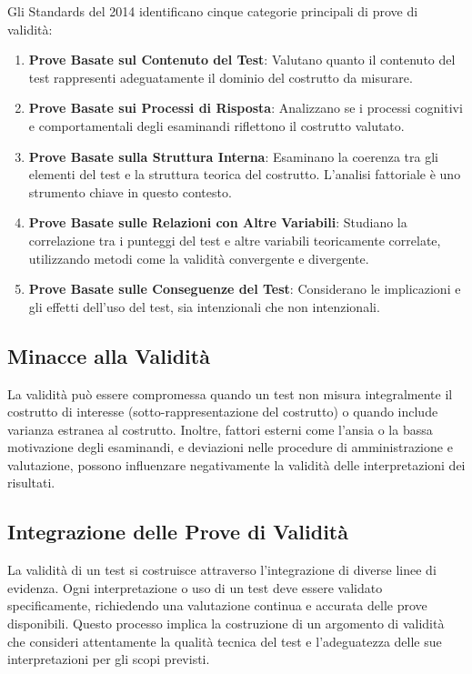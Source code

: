 \documentclass[
  letterpaper,
  krantz2]{{[}./krantz{]}}
\providecommand{\tightlist}{%
  \setlength{\itemsep}{0pt}\setlength{\parskip}{0pt}}\usepackage{longtable,booktabs,array}
\begin{document}
Gli Standards del 2014 identificano cinque categorie principali di prove
di validità:

\begin{enumerate}
\def\labelenumi{\arabic{enumi}.}
\tightlist
\item
  \textbf{Prove Basate sul Contenuto del Test}: Valutano quanto il
  contenuto del test rappresenti adeguatamente il dominio del costrutto
  da misurare.
\item
  \textbf{Prove Basate sui Processi di Risposta}: Analizzano se i
  processi cognitivi e comportamentali degli esaminandi riflettono il
  costrutto valutato.
\item
  \textbf{Prove Basate sulla Struttura Interna}: Esaminano la coerenza
  tra gli elementi del test e la struttura teorica del costrutto.
  L'analisi fattoriale è uno strumento chiave in questo contesto.
\item
  \textbf{Prove Basate sulle Relazioni con Altre Variabili}: Studiano la
  correlazione tra i punteggi del test e altre variabili teoricamente
  correlate, utilizzando metodi come la validità convergente e
  divergente.
\item
  \textbf{Prove Basate sulle Conseguenze del Test}: Considerano le
  implicazioni e gli effetti dell'uso del test, sia intenzionali che non
  intenzionali.
\end{enumerate}

\subsection{Minacce alla Validità}\label{minacce-alla-validituxe0}

La validità può essere compromessa quando un test non misura
integralmente il costrutto di interesse (sotto-rappresentazione del
costrutto) o quando include varianza estranea al costrutto. Inoltre,
fattori esterni come l'ansia o la bassa motivazione degli esaminandi, e
deviazioni nelle procedure di amministrazione e valutazione, possono
influenzare negativamente la validità delle interpretazioni dei
risultati.

\subsection{Integrazione delle Prove di
Validità}\label{integrazione-delle-prove-di-validituxe0}

La validità di un test si costruisce attraverso l'integrazione di
diverse linee di evidenza. Ogni interpretazione o uso di un test deve
essere validato specificamente, richiedendo una valutazione continua e
accurata delle prove disponibili. Questo processo implica la costruzione
di un argomento di validità che consideri attentamente la qualità
tecnica del test e l'adeguatezza delle sue interpretazioni per gli scopi
previsti.
\end{document}
